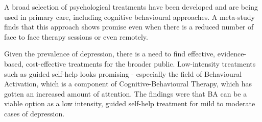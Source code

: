 A broad selection of psychological treatments have been developed and are being used in primary care, including cognitive behavioural approaches. A meta-study finds that this approach shows promise even  when there is a reduced number of face to face therapy sessions or even remotely.

Given the prevalence of depression, there is a need to find effective, evidence-based, cost-effective treatments for the broader public. Low-intensity treatments such as guided self-help looks promising - especially the field of  Behavioural Activation, which is a component of Cognitive-Behavioural Therapy, which has gotten an increased amount of attention. The findings were that BA can be a viable option as a low intensity, guided self-help treatment for mild to moderate cases of depression.
